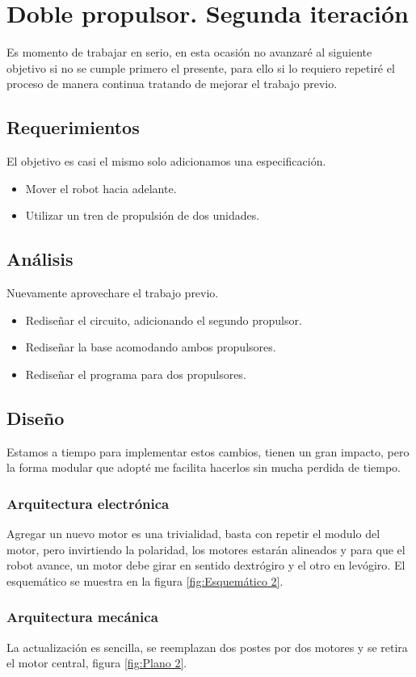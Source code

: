 \chapter{Doble propulsor. Segunda iteración}
Es momento de trabajar en serio, en esta ocasión no avanzaré al siguiente objetivo
si no se cumple primero el presente, para ello si lo requiero repetiré el proceso
de manera continua tratando de mejorar el trabajo previo.
\section{Requerimientos}
El objetivo es casi el mismo solo adicionamos una especificación.
\begin{itemize}
	\item Mover el robot hacia adelante.
	\item Utilizar un tren de propulsión de dos unidades.
\end{itemize}
\section{Análisis}
Nuevamente aprovechare el trabajo previo.
\begin{itemize}
	\item Rediseñar el circuito, adicionando el segundo propulsor.
	\item Rediseñar la base acomodando ambos propulsores.
	\item Rediseñar el programa para dos propulsores.
\end{itemize}
\section{Diseño}
Estamos a tiempo para implementar estos cambios, tienen un gran impacto, pero la
forma modular que adopté me facilita hacerlos sin mucha perdida de tiempo.  
\subsection{Arquitectura electrónica}
Agregar un nuevo motor es una trivialidad, basta con repetir el modulo del motor,
pero invirtiendo la polaridad, los motores estarán alineados
y para que el robot 
avance, un motor debe girar en sentido dextrógiro y el otro en levógiro.
El esquemático se muestra en la figura \ref{fig:Esquemático 2}.
\subsection{Arquitectura mecánica}
La actualización es sencilla, se reemplazan dos postes por dos motores y se 
retira el motor central, figura \ref{fig:Plano 2}.
